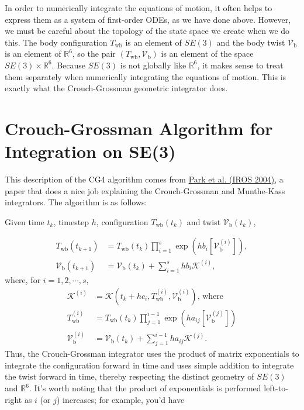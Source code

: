\documentclass[]{article}
\theoremstyle{definition}
\theoremstyle{remark}
\begin{document}
In order to numerically integrate the equations of motion, it often helps to express them as a system of first-order ODEs, as we have done above.
However, we must be careful about the topology of the state space we create when we do this.
The body configuration $T_\mathrm{wb}$ is an element of $SE(3)$ and the body twist $\mathcal{V}_\mathrm{b}$ is an element of $\mathbb{R}^6$, so the pair $\left(T_\mathrm{wb},\mathcal{V}_\mathrm{b}\right)$ is an element of the space $SE(3)\times\mathbb{R}^6$.
Because $SE(3)$ is not globally like $\mathbb{R}^6$, it makes sense to treat them separately when numerically integrating the equations of motion.
This is exactly what the Crouch-Grossman geometric integrator does.

\section{Crouch-Grossman Algorithm for Integration on SE(3)}
This description of the CG4 algorithm comes from \href{https://doi.org/10.1109/IROS.2004.1390007}{Park et al. (IROS 2004)}, a paper that does a nice job explaining the Crouch-Grossman and Munthe-Kass integrators. The algorithm is as follows:
\bigskip

\noindent Given time $t_k$, timestep $h$, configuration $T_\mathrm{wb}(t_k)$ and twist $\mathcal{V}_\mathrm{b}(t_k)$,

\begin{subequations}
\begin{align}
T_\mathrm{wb}\left(t_{k+1}\right) &= T_\mathrm{wb}\left(t_k\right)\prod_{i=1}^{s}\exp\left(h b_i \left[\mathcal{V}_\mathrm{b}^{(i)}\right]\right),\\
\mathcal{V}_\mathrm{b}\left(t_{k+1}\right) &= \mathcal{V}_\mathrm{b}(t_k) + \sum_{i=1}^{s}h b_i\mathcal{K}^{(i)},
\end{align}
\end{subequations}
where, for $i = 1,2,\cdots,s$,
\begin{subequations}
\begin{align}
\mathcal{K}^{(i)} &= \mathcal{K}\left(t_k + h c_i,T_\mathrm{wb}^{(i)},\mathcal{V}_\mathrm{b}^{(i)}\right)\text{, where}\\
T_\mathrm{wb}^{(i)} &= T_\mathrm{wb}\left(t_k\right)\prod_{j=1}^{i-1}\exp\left(h a_{ij} \left[\mathcal{V}_\mathrm{b}^{(j)}\right]\right)\\
\mathcal{V}_\mathrm{b}^{(i)} &= \mathcal{V}_\mathrm{b}\left(t_k\right) + \sum_{j=1}^{i-1}h a_{ij}\mathcal{K}^{(j)}.
\end{align}
\end{subequations}
Thus, the Crouch-Grossman integrator uses the product of matrix exponentials to integrate the configuration forward in time and uses simple addition to integrate the twist forward in time, thereby respecting the distinct geometry of $SE(3)$ and $\mathbb{R}^6$.
It's worth noting that the product of exponentials is performed left-to-right as $i$ (or $j$) increases; for example, you'd have 
\end{document}
